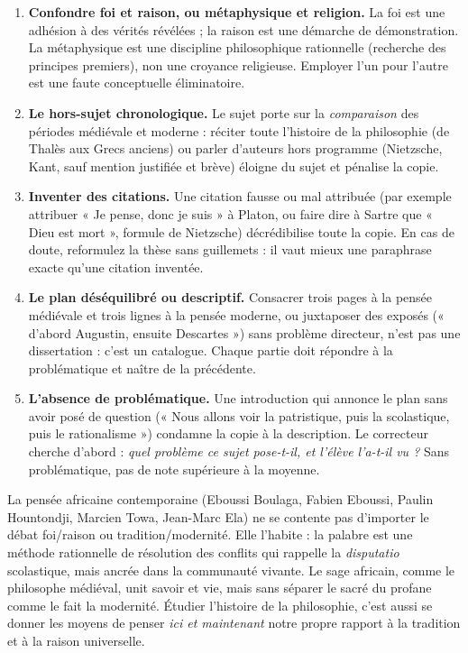 \documentclass[11pt]{article}
\newcommand{\cle}[1]{{\popxbold\color{popdark}#1}}
\begin{document}
\begin{attention}
\begin{enumerate}
\item \textbf{Confondre foi et raison, ou métaphysique et religion.} La foi est une adhésion à des vérités révélées ; la raison est une démarche de démonstration. La métaphysique est une discipline philosophique rationnelle (recherche des principes premiers), non une croyance religieuse. Employer l'un pour l'autre est une faute conceptuelle éliminatoire.
\item \textbf{Le hors-sujet chronologique.} Le sujet porte sur la \emph{comparaison} des périodes médiévale et moderne : réciter toute l'histoire de la philosophie (de Thalès aux Grecs anciens) ou parler d'auteurs hors programme (Nietzsche, Kant, sauf mention justifiée et brève) éloigne du sujet et pénalise la copie.
\item \textbf{Inventer des citations.} Une citation fausse ou mal attribuée (par exemple attribuer « Je pense, donc je suis » à Platon, ou faire dire à Sartre que « Dieu est mort », formule de Nietzsche) décrédibilise toute la copie. En cas de doute, reformulez la thèse sans guillemets : il vaut mieux une paraphrase exacte qu'une citation inventée.
\item \textbf{Le plan déséquilibré ou descriptif.} Consacrer trois pages à la pensée médiévale et trois lignes à la pensée moderne, ou juxtaposer des exposés (« d'abord Augustin, ensuite Descartes ») sans problème directeur, n'est pas une dissertation : c'est un catalogue. Chaque partie doit répondre à la problématique et naître de la précédente.
\item \textbf{L'absence de problématique.} Une introduction qui annonce le plan sans avoir posé de question (« Nous allons voir la patristique, puis la scolastique, puis le rationalisme ») condamne la copie à la description. Le correcteur cherche d'abord : \emph{quel problème ce sujet pose-t-il, et l'élève l'a-t-il vu ?} Sans problématique, pas de note supérieure à la moyenne.
\end{enumerate}
\end{attention}

\begin{savaistu}
La pensée africaine contemporaine (Eboussi Boulaga, Fabien Eboussi, Paulin Hountondji, Marcien Towa, Jean-Marc Ela) ne se contente pas d'importer le débat foi/raison ou tradition/modernité. Elle l'habite : la \cle{palabre} est une méthode rationnelle de résolution des conflits qui rappelle la \emph{disputatio} scolastique, mais ancrée dans la communauté vivante. Le \cle{sage} africain, comme le philosophe médiéval, unit savoir et vie, mais sans séparer le sacré du profane comme le fait la modernité. Étudier l'histoire de la philosophie, c'est aussi se donner les moyens de penser \emph{ici et maintenant} notre propre rapport à la tradition et à la raison universelle.
\end{savaistu}
\end{document}
